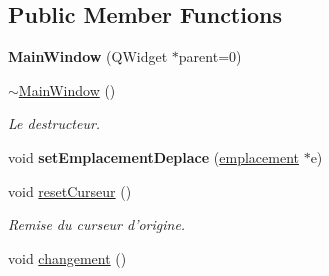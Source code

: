 \subsection*{Public Member Functions}
\begin{DoxyCompactItemize}
\item 
\hypertarget{class_main_window_a8b244be8b7b7db1b08de2a2acb9409db}{{\bfseries Main\-Window} (Q\-Widget $\ast$parent=0)}\label{class_main_window_a8b244be8b7b7db1b08de2a2acb9409db}

\item 
\hyperlink{class_main_window_ae98d00a93bc118200eeef9f9bba1dba7}{$\sim$\-Main\-Window} ()
\begin{DoxyCompactList}\small\item\em Le destructeur. \end{DoxyCompactList}\item 
\hypertarget{class_main_window_a1eefa05031d74694e4249a8c68741122}{void {\bfseries set\-Emplacement\-Deplace} (\hyperlink{classemplacement}{emplacement} $\ast$e)}\label{class_main_window_a1eefa05031d74694e4249a8c68741122}

\item 
\hypertarget{class_main_window_a3ab75adb0221eb5e362f2070f71ebc22}{void \hyperlink{class_main_window_a3ab75adb0221eb5e362f2070f71ebc22}{reset\-Curseur} ()}\label{class_main_window_a3ab75adb0221eb5e362f2070f71ebc22}

\begin{DoxyCompactList}\small\item\em Remise du curseur d'origine. \end{DoxyCompactList}\item 
\hypertarget{class_main_window_a3c0bedf7eae76f0c5ca35bd16491b919}{void \hyperlink{class_main_window_a3c0bedf7eae76f0c5ca35bd16491b919}{changement} ()}\label{class_main_window_a3c0bedf7eae76f0c5ca35bd16491b919}


\end{DoxyCompactItemize}
